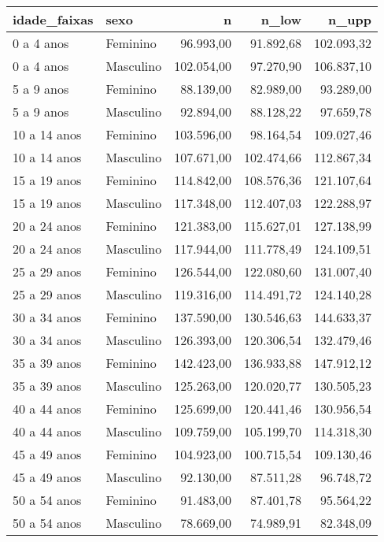 \documentclass[]{article}
\begin{document}
\begin{table}[!hb]
\centering
\begin{tabular}{llrrr}
  \hline
idade\_faixas & sexo & n & n\_low & n\_upp \\ 
  \hline
0 a 4 anos & Feminino & 96.993,00 & 91.892,68 & 102.093,32 \\ 
  0 a 4 anos & Masculino & 102.054,00 & 97.270,90 & 106.837,10 \\ 
  5 a 9 anos & Feminino & 88.139,00 & 82.989,00 & 93.289,00 \\ 
  5 a 9 anos & Masculino & 92.894,00 & 88.128,22 & 97.659,78 \\ 
  10 a 14 anos & Feminino & 103.596,00 & 98.164,54 & 109.027,46 \\ 
  10 a 14 anos & Masculino & 107.671,00 & 102.474,66 & 112.867,34 \\ 
  15 a 19 anos & Feminino & 114.842,00 & 108.576,36 & 121.107,64 \\ 
  15 a 19 anos & Masculino & 117.348,00 & 112.407,03 & 122.288,97 \\ 
  20 a 24 anos & Feminino & 121.383,00 & 115.627,01 & 127.138,99 \\ 
  20 a 24 anos & Masculino & 117.944,00 & 111.778,49 & 124.109,51 \\ 
  25 a 29 anos & Feminino & 126.544,00 & 122.080,60 & 131.007,40 \\ 
  25 a 29 anos & Masculino & 119.316,00 & 114.491,72 & 124.140,28 \\ 
  30 a 34 anos & Feminino & 137.590,00 & 130.546,63 & 144.633,37 \\ 
  30 a 34 anos & Masculino & 126.393,00 & 120.306,54 & 132.479,46 \\ 
  35 a 39 anos & Feminino & 142.423,00 & 136.933,88 & 147.912,12 \\ 
  35 a 39 anos & Masculino & 125.263,00 & 120.020,77 & 130.505,23 \\ 
  40 a 44 anos & Feminino & 125.699,00 & 120.441,46 & 130.956,54 \\ 
  40 a 44 anos & Masculino & 109.759,00 & 105.199,70 & 114.318,30 \\ 
  45 a 49 anos & Feminino & 104.923,00 & 100.715,54 & 109.130,46 \\ 
  45 a 49 anos & Masculino & 92.130,00 & 87.511,28 & 96.748,72 \\ 
  50 a 54 anos & Feminino & 91.483,00 & 87.401,78 & 95.564,22 \\ 
  50 a 54 anos & Masculino & 78.669,00 & 74.989,91 & 82.348,09 \\ 

\end{tabular}
\end{table}
\end{document}
